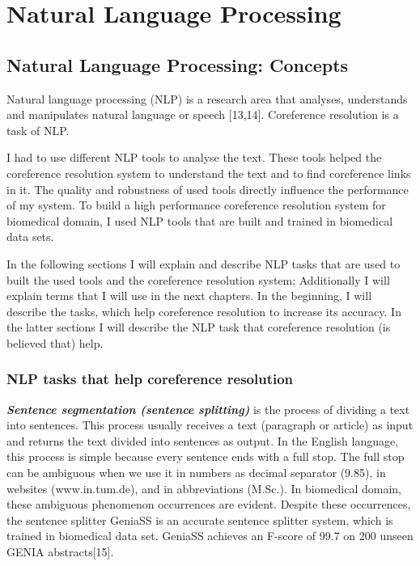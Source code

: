 \chapter{Natural Language Processing}
\label{chapter:Natural Language Processing}
\section{Natural Language Processing: Concepts}

Natural language processing (NLP) is a research area that analyses, understands and manipulates natural language or speech [13,14]. Coreference resolution is a task of NLP. 

I had to use different NLP tools to analyse the text. These tools helped  the coreference resolution system to understand the text and to find coreference links in it. The quality and robustness of used tools directly influence the performance of my system. To build a high performance coreference resolution system for biomedical domain, I used NLP tools that are built and trained in biomedical data sets. 

In the following sections I will explain and describe NLP tasks that are used to built the used tools and the coreference resolution system; Additionally I will explain terms that I will use in the next chapters. In the beginning, I will describe the tasks, which help coreference resolution to increase its accuracy. In the latter sections I will describe the NLP task that coreference resolution (is believed that) help.

\subsection{NLP tasks that help coreference resolution}

\emph{ \textbf{ Sentence segmentation (sentence splitting)}} is the process of dividing a text into sentences. This process usually receives a text (paragraph or article) as input and returns the text divided into sentences as output. 
In the English language, this process is simple because every sentence ends with a full stop. The full stop can be ambiguous when we use it in numbers as decimal separator (9.85), in websites (www.in.tum.de), and in abbreviations (M.Sc.). In biomedical domain, these ambiguous phenomenon occurrences are evident. 
Despite these occurrences, the sentence splitter GeniaSS is an accurate sentence splitter system, which is trained in biomedical data set. GeniaSS achieves an F-score of 99.7 on 200 unseen GENIA abstracts[15].\\

